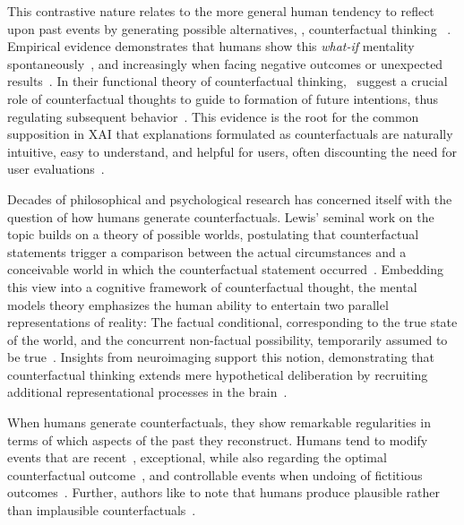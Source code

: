 This contrastive nature relates to the more general human tendency to reflect upon past events by generating possible alternatives, \ie, counterfactual thinking ~\citep{roese_counterfactual_1997}.
Empirical evidence demonstrates that humans show this \textit{what-if} mentality spontaneously~\citep{goldinger_blaming_2003}, and increasingly when facing negative outcomes or unexpected results~\citep{sanna_antecedents_1996}.
In their functional theory of counterfactual thinking,~\citeauthor{roese_functional_2017} suggest a crucial role of counterfactual thoughts to guide to formation of future intentions, thus regulating subsequent behavior~\citep{roese_functional_2017,epstude_functional_2008}.
This evidence is the root for the common supposition in \gls{XAI} that explanations formulated as counterfactuals are naturally intuitive, easy to understand, and helpful for users, often discounting the need for user evaluations~\citep{stepin_paving_2019, dandl_multi-objective_2020, guidotti_local_2018, artelt_efficient_2022}.

Decades of philosophical and psychological research has concerned itself with the question of how humans generate counterfactuals. 
Lewis' seminal work on the topic builds on a theory of possible worlds, postulating that counterfactual statements trigger a comparison between the actual circumstances and a conceivable world in which the counterfactual statement occurred~\citep{lewis_counterfactuals_1973}.
Embedding this view into a cognitive framework of counterfactual thought, the mental models theory emphasizes the human ability to entertain two parallel representations of reality: The factual conditional, corresponding to the true state of the world, and the concurrent non-factual possibility, temporarily assumed to be true~\citep{byrne_mental_2002,byrne_precis_2007,johnson-laird_conditionals_2002,walsh_mental_2005}.
Insights from neuroimaging support this notion, demonstrating that counterfactual thinking extends mere hypothetical deliberation by recruiting additional representational processes in the brain~\citep{kulakova_processing_2013}.

When humans generate counterfactuals, they show remarkable regularities in terms of which aspects of the past they reconstruct. 
Humans tend to modify events that are recent~\citep{miller_temporal_1990, byrne_temporality_2000}, exceptional, while also regarding the optimal counterfactual outcome~\citep{kahneman_simulation_1982, dixon_if_2011}, and 
controllable events when undoing of fictitious outcomes~\citep{girotto_event_1991}.
Further, authors like to note that humans produce plausible rather than implausible counterfactuals~\citep{byrne_counterfactual_2016, de_brigard_coming_2013}.

